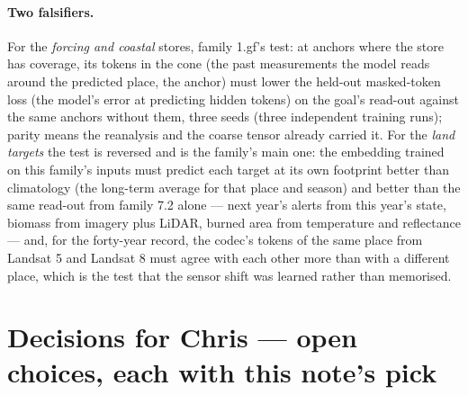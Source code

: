 \documentclass[10pt]{article}
\begin{document}
\paragraph{Two falsifiers.} For the \emph{forcing and coastal} stores,
family 1.gf's test: at anchors where the store has coverage, its tokens in
the cone (the past measurements the model reads around the predicted place, the anchor) must lower the held-out masked-token loss (the model's error at predicting hidden tokens) on the goal's read-out
against the same anchors without them, three seeds (three independent training runs); parity means the
reanalysis and the coarse tensor already carried it. For the \emph{land
targets} the test is reversed and is the family's main one: the embedding
trained on this family's inputs must predict each target at its own
footprint better than climatology (the long-term average for that place and season) and better than the same read-out from
family 7.2 alone --- next year's alerts from this year's state, biomass from
imagery plus LiDAR, burned area from temperature and reflectance --- and, for
the forty-year record, the codec's tokens of the same place from Landsat 5
and Landsat 8 must agree with each other more than with a different place,
which is the test that the sensor shift was learned rather than memorised.

\section{Decisions for Chris --- open choices, each with this note's pick}
\end{document}
